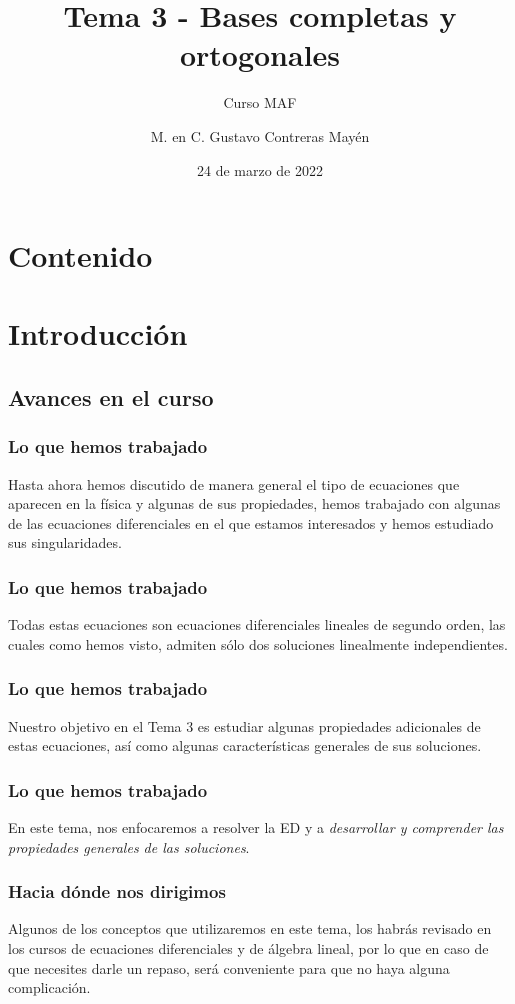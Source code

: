 \documentclass[12pt]{beamer}
\date{24 de marzo de 2022}
\title{\large{Tema 3 - Bases completas y ortogonales}}
\subtitle{Curso MAF}
\author{M. en C. Gustavo Contreras Mayén}
\begin{document}
\maketitle
\fontsize{14}{14}\selectfont
{}

\section*{Contenido}

\section{Introducción}
\subsection{Avances en el curso}

\begin{frame}
\frametitle{Lo que hemos trabajado}
Hasta ahora hemos discutido de manera general el tipo de ecuaciones que aparecen en la física y algunas de sus propiedades, hemos trabajado con algunas de las ecuaciones diferenciales en el que estamos interesados y hemos estudiado sus singularidades.
\end{frame}
\begin{frame}
\frametitle{Lo que hemos trabajado}
Todas estas ecuaciones son ecuaciones diferenciales lineales de segundo orden, las cuales como hemos visto, admiten sólo dos soluciones linealmente independientes.
\end{frame}
\begin{frame}
\frametitle{Lo que hemos trabajado}
Nuestro objetivo en el Tema 3 es estudiar algunas propiedades adicionales de estas ecuaciones, así como algunas características generales de sus soluciones. 
\end{frame}
\begin{frame}
\frametitle{Lo que hemos trabajado}
En este tema, nos enfocaremos a resolver la ED y a \emph{desarrollar y comprender las propiedades generales de las soluciones}.
\end{frame}
\begin{frame}
\frametitle{Hacia dónde nos dirigimos}
Algunos de los conceptos que utilizaremos en este tema, los habrás revisado en los cursos de ecuaciones diferenciales y de álgebra lineal, por lo que en caso de que necesites darle un repaso, será conveniente para que no haya alguna complicación.
\end{frame}
\end{document}
